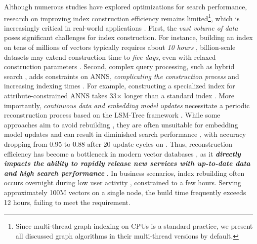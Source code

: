 Although numerous studies \cite{LiZAH20,ADSampling,HVS,yue2023routing,Finger,ColemanSSS22,PengZLJR23} have explored optimizations for search performance, research on improving index construction efficiency remains limited\footnote{{Since multi-thread graph indexing on CPUs is a standard practice, we present all discussed graph algorithms in their multi-thread versions by default.}}, which is increasingly critical in real-world applications \cite{XuLLXCZLYYYCY23}. 
First, the {\em vast volume of data} poses significant challenges for index construction. For instance, building an  index on tens of millions of vectors typically requires about \textit{10 hours} \cite{HVS,lanns}, billion-scale datasets may extend construction time to \textit{five days}, even with relaxed construction parameters \cite{DiskANN}. 
Second, complex query processing, such as hybrid search \cite{Filtered-DiskANN,mengzhao_neurips2023}, adds constraints on ANNS, {\em complicating the construction process} and increasing indexing times \cite{ZuoQZLD24}. For example, constructing a specialized  index for attribute-constrained ANNS takes 33$\times$ longer than a standard index \cite{PatelKGZ24}. 
More importantly, {\em continuous data and embedding model updates} \cite{Neos,Jingdong_paper,SundaramTSMIMD13,embedding_models_update_1,embedding_models_update_2} necessitate a periodic reconstruction process based on the LSM-Tree framework \cite{Milvus_sigmod2021,ADBV,pan2023survey,nmslib_issues73,SingleStore-V,XuLLXCZLYYYCY23}.
While some approaches aim to avoid rebuilding \cite{Fresh-DiskANN}, they are often unsuitable for embedding model updates \cite{PouyanfarSYTTRS19,embedding_models_update_1} and can result in diminished search performance \cite{nmslib_issues73}, with accuracy dropping from 0.95 to 0.88 after 20 update cycles on  \cite{Fresh-DiskANN}. 
Thus, reconstruction efficiency has become a bottleneck in modern vector databases \cite{pan2023survey}, as it {\bf \em directly impacts the ability to rapidly release new services with up-to-date data and high search performance} \cite{Fresh-DiskANN,ADBV}. In business scenarios, index rebuilding often occurs overnight during low user activity \cite{ADBV}, constrained to a few hours. Serving approximately 100M vectors on a single node, the  build time frequently exceeds 12 hours, failing to meet the requirement.

